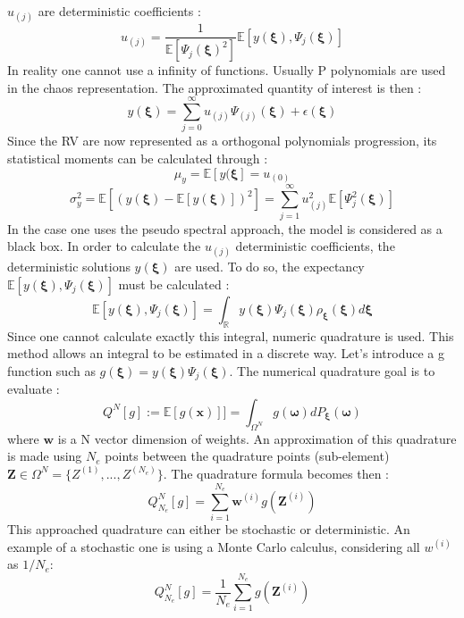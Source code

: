 \documentclass[11pt, a4paper, English]{report}
\begin{document}
$u_{(j)}$ are deterministic coefficients :
$$u_{(j)}=\frac{1}{\mathbb{E}[\Psi_j(\boldsymbol{\xi})^2]}\mathbb{E}[y(\boldsymbol{\xi}),\Psi_j(\boldsymbol{\xi})]  $$
In reality one cannot use a infinity of functions. Usually P polynomials are used in the chaos representation. The approximated quantity of interest is then :
$$y(\boldsymbol{\xi})=\sum_{j=0}^{\infty}u_{(j)}\Psi_{(j)}(\boldsymbol{\xi})+\epsilon(\boldsymbol{\xi})$$
Since the RV are now represented as a orthogonal polynomials progression, its statistical moments can be calculated through :
$$ \mu_y = \mathbb{E}[y(\boldsymbol{\xi}]=u_{(0)} $$
$$\sigma_y^2 = \mathbb{E}[(y(\boldsymbol{\xi}) - \mathbb{E}[y(\boldsymbol{\xi})])^2]=\sum_{j=1}^\infty u_{(j)}^2\mathbb{E}[\Psi_j^2(\boldsymbol{\xi})]
$$ %
In the case one uses the pseudo spectral approach, the model is considered as a black box. In order to calculate the $u_{(j)}$ deterministic coefficients, the deterministic solutions $y(\boldsymbol{\xi})$ are used. To do so, the expectancy $\mathbb{E}[y(\boldsymbol{\xi}),\Psi_j(\boldsymbol{\xi})]$ must be calculated :
$$\mathbb{E}[y(\boldsymbol{\xi}),\Psi_j(\boldsymbol{\xi})] = \int_{\mathbb{R}} y(\boldsymbol{\xi}) \Psi_j (\boldsymbol{\xi}) \rho_{\boldsymbol{\xi}} (\boldsymbol{\xi}) d\boldsymbol{\xi}$$
Since one cannot calculate exactly this integral, numeric quadrature is used. This method allows an integral to be estimated in a discrete way. Let's introduce a g function such as $g(\boldsymbol{\xi}) = y(\boldsymbol{\xi}) \Psi_j (\boldsymbol{\xi})$. The numerical quadrature goal is to evaluate :
$$ Q^N[g] := \mathbb{E}[g(\boldsymbol{x})]] = \int_{\Omega^N} g(\boldsymbol{\omega}) dP_{\boldsymbol{\xi}}(\boldsymbol{\omega})$$ 
where $\boldsymbol{w}$ is a N vector dimension of weights. An approximation of this quadrature is made using $N_e$ points between the quadrature points (sub-element) $\boldsymbol{Z} \in \Omega^N = \{Z^{(1)},..., Z^{(N_e)}\}$. The quadrature formula becomes then \cite{CoursLucor}:
$$Q_{N_e}^N [g]= \sum_{i=1}^{N_e} \boldsymbol{w}^{(i)} g(\boldsymbol{Z}^{(i)})$$
This approached quadrature can either be stochastic or deterministic. An example of a stochastic one is using a Monte Carlo calculus, considering all $w^{(i)}$ as $1/N_e$:
$$Q_{N_e}^N [g]= \frac{1}{N_e}\sum_{i=1}^{N_e}  g(\boldsymbol{Z}^{(i)})$$
\end{document}
